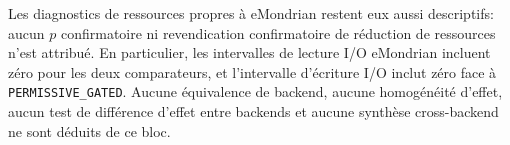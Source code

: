 Les diagnostics de ressources propres à eMondrian restent eux aussi descriptifs: aucun
$p$ confirmatoire ni revendication confirmatoire de réduction de ressources n'est attribué.
En particulier, les intervalles de lecture I/O eMondrian incluent zéro pour les deux
comparateurs, et l'intervalle d'écriture I/O inclut zéro face à
\texttt{PERMISSIVE\_GATED}. Aucune équivalence de backend, aucune homogénéité d'effet,
aucun test de différence d'effet entre backends et aucune synthèse cross-backend ne sont
déduits de ce bloc.
